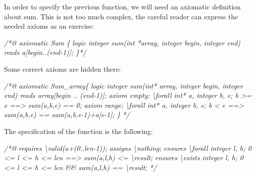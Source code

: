 \documentclass[12pt,francais,]{scrbook}
\newenvironment{Shaded}{}{}
\newcommand{\CommentTok}[1]{\textcolor[rgb]{0.38,0.63,0.69}{\textit{{#1}}}}
\newenvironment{zdssecretblock}[1]{%
  \tcolorbox[beamer,%
    noparskip,breakable,
    colback=LightGray,colframe=DarkGray,%
    colbacklower=LightGray,%
    title=#1]
}{\endtcolorbox}
\begin{document}
In order to specify the previous function, we will need an axiomatic
definition about sum. This is not too much complex, the careful reader
can express the needed axioms as an exercise:

\begin{footnotesize}\begin{Shaded}
\begin{Highlighting}[]
\CommentTok{/*@ axiomatic Sum \{}
\CommentTok{  logic integer sum(int *array, integer begin, integer end) reads a[begin..(end-1)];}
\CommentTok{\}*/}
\end{Highlighting}
\end{Shaded}\end{footnotesize}

Some correct axioms are hidden there:

\begin{zdssecretblock}{Answer}
\begin{footnotesize}\begin{Shaded}
\begin{Highlighting}[]
\CommentTok{/*@}
\CommentTok{  axiomatic Sum_array\{}
\CommentTok{    logic integer sum(int* array, integer begin, integer end) }
\CommentTok{      reads array[begin .. (end-1)];}
\CommentTok{   }
\CommentTok{    axiom empty: }
\CommentTok{      \textbackslash{}forall int* a, integer b, e; b >= e ==> sum(a,b,e) == 0;}
\CommentTok{    axiom range:}
\CommentTok{      \textbackslash{}forall int* a, integer b, e; b < e ==> sum(a,b,e) == sum(a,b,e-1)+a[e-1];}
\CommentTok{  \}}
\CommentTok{*/}
\end{Highlighting}
\end{Shaded}\end{footnotesize}
\end{zdssecretblock}

The specification of the function is the following:

\begin{footnotesize}\begin{Shaded}
\begin{Highlighting}[]
\CommentTok{/*@ }
\CommentTok{  requires \textbackslash{}valid(a+(0..len-1));}
\CommentTok{  assigns \textbackslash{}nothing;}
\CommentTok{  ensures \textbackslash{}forall integer l, h;  0 <= l <= h <= len ==> sum(a,l,h) <= \textbackslash{}result;}
\CommentTok{  ensures \textbackslash{}exists integer l, h;  0 <= l <= h <= len &&  sum(a,l,h) == \textbackslash{}result;}
\CommentTok{*/}
\end{Highlighting}
\end{Shaded}\end{footnotesize}
\end{document}
